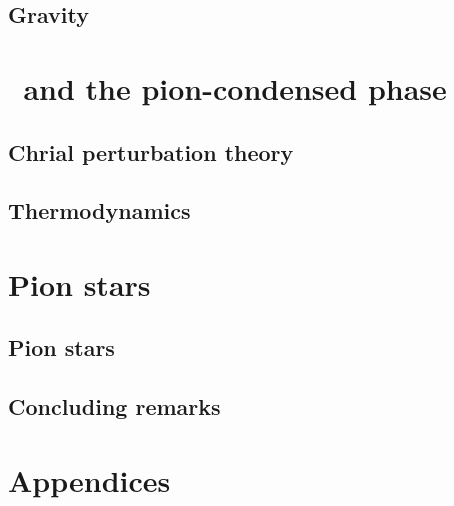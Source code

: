 \documentclass[10pt, a4paper]{book}
\begin{document}
    \chapter{Gravity}
    \label{chapter: GR}
    
    
    

    \part{\chpt\, and the pion-condensed phase}
    \label{part: chpt and the pion-condensed phase}

    \chapter{Chrial perturbation theory}
    \label{chapter: chpt}
    
    
    
    

    \chapter{Thermodynamics}
    \label{chapter: thermodynamics}
    
    
    
    

    \part{Pion stars}
    \label{part: pion stars}

    \chapter{Pion stars}
    \label{chapter: pion stars}
    

    \chapter{Concluding remarks}
    \label{Chapter: cocnlusion and discussion}
    


    \appendix
    \part*{Appendices}
    
\end{document}
